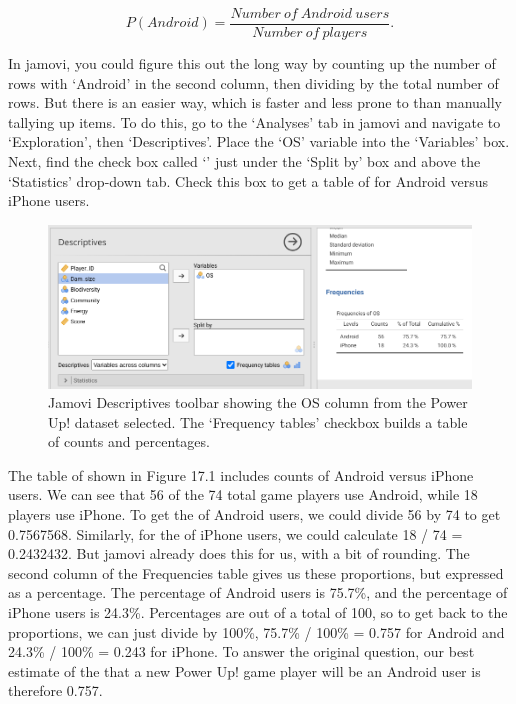 \documentclass[
  openany]{krantz}
\begin{document}
\[P(Android) = \frac{Number\:of\:Android\:users}{Number\:of\:players}.\]

In jamovi, you could figure this out the long way by counting up the number of rows with `Android' in the second column, then dividing by the total number of rows.
But there is an easier way, which is faster and less prone to  than manually tallying up items.
To do this, go to the `Analyses' tab in jamovi and navigate to `Exploration', then `Descriptives'.
Place the `OS' variable into the `Variables' box.
Next, find the check box called `' just under the `Split by' box and above the `Statistics' drop-down tab.
Check this box to get a table of  for Android versus iPhone users.

\begin{figure}
\includegraphics[width=1\linewidth]{img/jamovi_power_up_frequencies} \caption{Jamovi Descriptives toolbar showing the OS column from the Power Up! dataset selected. The `Frequency tables' checkbox builds a table of counts and percentages.}\label{fig:unnamed-chunk-66}
\end{figure}

The table of  shown in Figure 17.1 includes counts of Android versus iPhone users.
We can see that 56 of the 74 total game players use Android, while 18 players use iPhone.
To get the  of Android users, we could divide 56 by 74 to get 0.7567568.
Similarly, for the  of iPhone users, we could calculate 18 / 74 = 0.2432432.
But jamovi already does this for us, with a bit of rounding.
The second column of the Frequencies table gives us these proportions, but expressed as a percentage.
The percentage of Android users is 75.7\%, and the percentage of iPhone users is 24.3\%.
Percentages are out of a total of 100, so to get back to the proportions, we can just divide by 100\%, 75.7\% / 100\% = 0.757 for Android and 24.3\% / 100\% = 0.243 for iPhone.
To answer the original question, our best estimate of the  that a new Power Up! game player will be an Android user is therefore 0.757.
\end{document}
